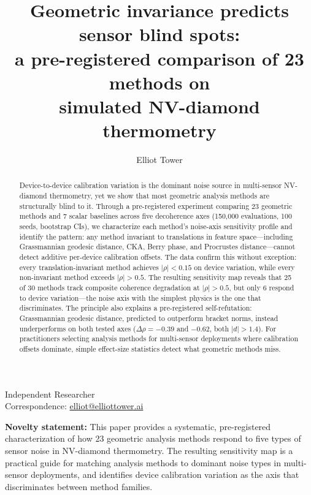 \documentclass[11pt]{article}
\title{Geometric invariance predicts sensor blind spots:\\
  a pre-registered comparison of 23 methods on\\
  simulated NV-diamond thermometry}
\author{Elliot Tower\orcid{0000-0001-7004-8884}}
\date{}
\begin{document}
\maketitle

\noindent Independent Researcher\\
\noindent Correspondence: \href{mailto:elliot@elliottower.ai}{elliot@elliottower.ai}

\bigskip

\noindent\textbf{Novelty statement:}
This paper provides a systematic, pre-registered characterization of how
23 geometric analysis methods respond to five types of sensor noise in
NV-diamond thermometry.  The resulting sensitivity map is a practical
guide for matching analysis methods to dominant noise types in
multi-sensor deployments, and identifies device calibration variation as
the axis that discriminates between method families.

\bigskip

\begin{abstract}
Device-to-device calibration variation is the dominant noise source in
multi-sensor NV-diamond thermometry, yet we show that most geometric
analysis methods are structurally blind to it.  Through a pre-registered
experiment comparing 23 geometric methods and 7 scalar baselines across
five decoherence axes (150,000 evaluations, 100 seeds, bootstrap CIs),
we characterize each method's noise-axis sensitivity profile and
identify the pattern: any method invariant to translations in feature
space---including Grassmannian geodesic distance, CKA, Berry phase, and
Procrustes distance---cannot detect additive per-device calibration
offsets.  The data confirm this without
exception: every translation-invariant method achieves $|\rho| < 0.15$
on device variation, while every non-invariant method exceeds
$|\rho| > 0.5$.  The resulting sensitivity map reveals that 25 of 30
methods track composite coherence degradation at $|\rho| > 0.5$, but
only 6 respond to device variation---the noise axis with the simplest
physics is the one that discriminates.  The principle also explains a
pre-registered self-refutation: Grassmannian geodesic distance, predicted
to outperform bracket norms, instead underperforms on both tested axes
($\Delta\rho = -0.39$ and $-0.62$, both $|d| > 1.4$).  For
practitioners selecting analysis methods for multi-sensor deployments
where calibration offsets dominate, simple effect-size statistics detect
what geometric methods miss.
\end{abstract}
\end{document}
